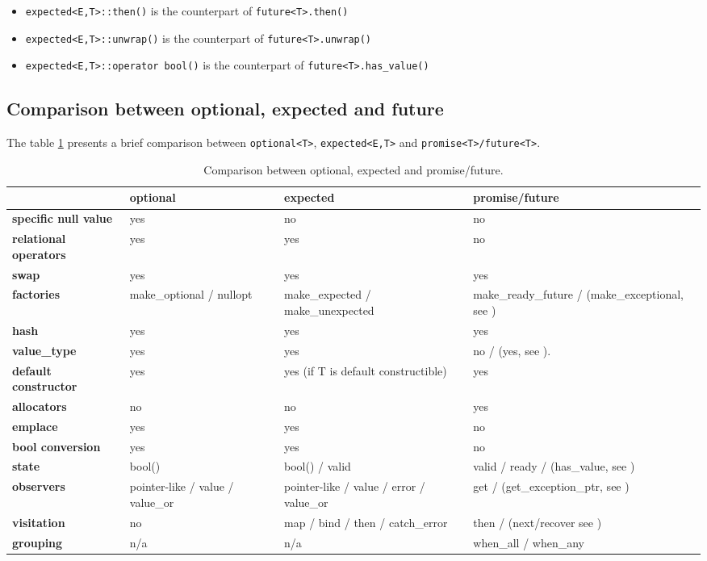 \documentclass[a4paper,10pt]{article}
\newcommand{\cpp}[1]{\lstinline{#1}}
\begin{document}
\begin{itemize}
 \item \cpp{expected<E,T>::then()} is the counterpart of \cpp{future<T>.then()}
 \item \cpp{expected<E,T>::unwrap()} is the counterpart of \cpp{future<T>.unwrap()}
 \item \cpp{expected<E,T>::operator bool()} is the counterpart of \cpp{future<T>.has_value()}
\end{itemize}

\subsection{Comparison between optional, expected and future}

The table \ref{comp-monads} presents a brief comparison between \cpp{optional<T>}, \cpp{expected<E,T>}  and \cpp{promise<T>/future<T>}.

\begin{table}
\bgroup
\def\arraystretch{1.5}
\begin{tabular}{|l|>{\raggedright\arraybackslash}p{4cm}|>{\raggedright\arraybackslash}p{4cm}|>{\raggedright\arraybackslash}p{4cm}|}
\hline
                    & \textbf{optional} & \textbf{expected} & \textbf{promise/future} \\
\hline
\textbf{specific null value} & yes & no & no \\
\hline
\textbf{relational operators} & yes & yes & no \\
\hline
\textbf{swap} & yes & yes & yes \\
\hline
\textbf{factories} & make_optional / nullopt & make_expected / make_unexpected & make_ready_future / (make_exceptional, see \cite{MoreAsync}) \\
\hline
\textbf{hash} & yes & yes & yes \\
\hline
\textbf{value_type} & yes & yes & no / (yes, see \cite{MoreAsync}).  \\
\hline
\textbf{default constructor} & yes & yes (if T is default constructible) & yes \\
\hline
\textbf{allocators} & no & no & yes \\
\hline
\textbf{emplace} & yes & yes & no \\
\hline
\textbf{bool conversion} & yes & yes & no \\
\hline
\textbf{state} & bool()  &  bool() / valid & valid / ready / (has_value, see \cite{MoreAsync}) \\
\hline
\textbf{observers} & pointer-like / value / value_or & pointer-like / value / error / value_or & get / (get_exception_ptr, see \cite{MoreAsync}) \\
\hline
\textbf{visitation} & no & map / bind / then / catch_error  & then / (next/recover see \cite{MoreAsync}) \\
\hline
\textbf{grouping} & n/a & n/a & when_all / when_any \\
\hline
\end{tabular}
\egroup
\caption{Comparison between optional, expected and promise/future.}
\label{comp-monads}
\end{table}
\end{document}

